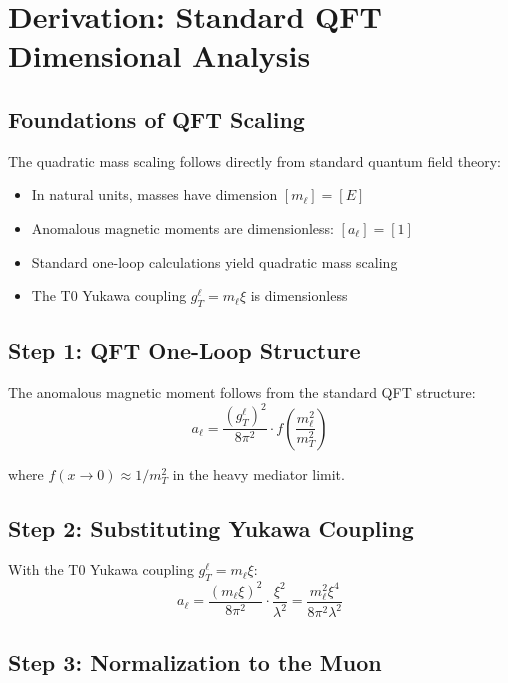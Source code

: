 \documentclass[12pt,a4paper]{article}
\begin{document}
	\section{Derivation: Standard QFT Dimensional Analysis}
	
	\subsection{Foundations of QFT Scaling}
	
	The quadratic mass scaling follows directly from standard quantum field theory:
	\begin{itemize}
		\item In natural units, masses have dimension $[m_\ell] = [E]$
		\item Anomalous magnetic moments are dimensionless: $[a_\ell] = [1]$
		\item Standard one-loop calculations yield quadratic mass scaling
		\item The T0 Yukawa coupling $g_T^\ell = m_\ell \xi$ is dimensionless
	\end{itemize}
	
	\subsection{Step 1: QFT One-Loop Structure}
	
	The anomalous magnetic moment follows from the standard QFT structure:
	\begin{equation}
		a_\ell = \frac{(g_T^\ell)^2}{8\pi^2} \cdot f\left(\frac{m_\ell^2}{m_T^2}\right)
	\end{equation}
	
	where $f(x \to 0) \approx 1/m_T^2$ in the heavy mediator limit.
	
	\subsection{Step 2: Substituting Yukawa Coupling}
	
	With the T0 Yukawa coupling $g_T^\ell = m_\ell \xi$:
	\begin{equation}
		a_\ell = \frac{(m_\ell \xi)^2}{8\pi^2} \cdot \frac{\xi^2}{\lambda^2} = \frac{m_\ell^2 \xi^4}{8\pi^2 \lambda^2}
	\end{equation}
	
	\subsection{Step 3: Normalization to the Muon}
	
\end{document}

